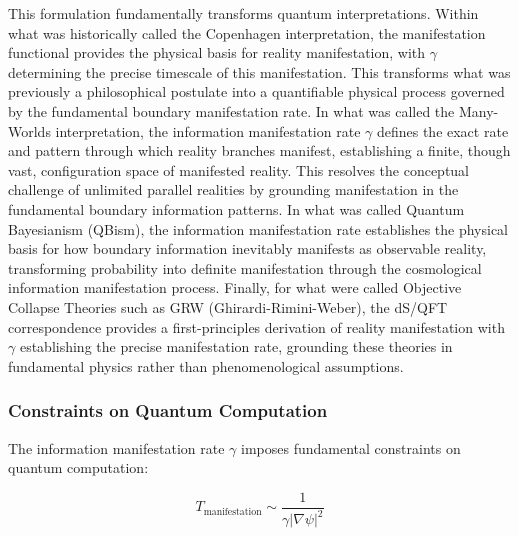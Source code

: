 \documentclass[11pt,english,twoside]{article}
\theoremstyle{plain}
\theoremstyle{definition}
\theoremstyle{remark}
\newcommand{\gammaR}{\gamma}
\begin{document}
This formulation fundamentally transforms quantum interpretations. Within what was historically called the Copenhagen interpretation, the manifestation functional provides the physical basis for reality manifestation, with $\gammaR$ determining the precise timescale of this manifestation. This transforms what was previously a philosophical postulate into a quantifiable physical process governed by the fundamental boundary manifestation rate. In what was called the Many-Worlds interpretation, the information manifestation rate $\gammaR$ defines the exact rate and pattern through which reality branches manifest, establishing a finite, though vast, configuration space of manifested reality. This resolves the conceptual challenge of unlimited parallel realities by grounding manifestation in the fundamental boundary information patterns. In what was called Quantum Bayesianism (QBism), the information manifestation rate establishes the physical basis for how boundary information inevitably manifests as observable reality, transforming probability into definite manifestation through the cosmological information manifestation process. Finally, for what were called Objective Collapse Theories such as GRW (Ghirardi-Rimini-Weber), the dS/QFT correspondence provides a first-principles derivation of reality manifestation with $\gammaR$ establishing the precise manifestation rate, grounding these theories in fundamental physics rather than phenomenological assumptions.


\subsubsection{Constraints on Quantum Computation}

The information manifestation rate $\gammaR$ imposes fundamental constraints on quantum computation:

\begin{equation}
T_{\text{manifestation}} \sim \frac{1}{\gammaR |\nabla\psi|^2}
\end{equation}
\end{document}
